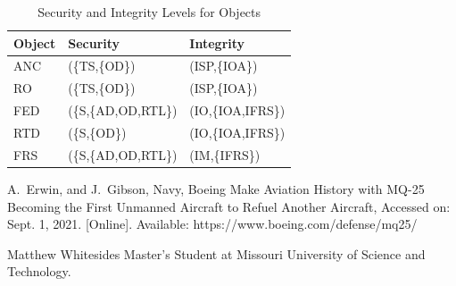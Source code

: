 \documentclass[10pt,journal,compsoc]{IEEEtran}
\begin{document}
\begin{table}[]
  \caption{Security and Integrity Levels for Objects}
  \label{tab:security-integrity-objects}
  \centering
  \begin{tabular}{lll}
  \hline
  \textbf{Object} & \textbf{Security} & \textbf{Integrity}   \\
  \hline
  ANC             & (\{TS,\{OD\})       & (ISP,\{IOA\})      \\
  RO              & (\{TS,\{OD\})       & (ISP,\{IOA\})      \\
  FED             & (\{S,\{AD,OD,RTL\}) & (IO,\{IOA,IFRS\})  \\ 
  RTD             & (\{S,\{OD\})        & (IO,\{IOA,IFRS\})  \\
  FRS             & (\{S,\{AD,OD,RTL\}) & (IM,\{IFRS\})  
  \end{tabular}
\end{table}



\ifCLASSOPTIONcaptionsoff
  \newpage
\fi

\begin{thebibliography}{1}

A.~Erwin, and J.~Gibson, Navy, Boeing Make Aviation History with MQ-25 Becoming the First Unmanned Aircraft to Refuel Another Aircraft, Accessed on: Sept. 1, 2021. [Online]. Available: https://www.boeing.com/defense/mq25/ 

\end{thebibliography}

\begin{IEEEbiographynophoto}{Matthew Whitesides}
  Master's Student at Missouri University of Science and Technology.
\end{IEEEbiographynophoto}

\end{document}
